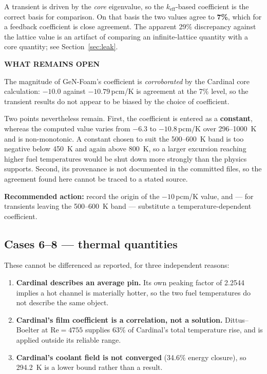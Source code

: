 \documentclass[11pt,a4paper]{article}
\newcommand{\keff}{\ensuremath{k_{\mathrm{eff}}}}
\newenvironment{callout}[2][warnbg]
 {\edef\calloutcolor{#1}\def\callouttitle{#2}%
  \begin{lrbox}{\calloutbox}%
  \begin{minipage}{\dimexpr\textwidth-2\fboxsep\relax}%
  \vspace{1mm}\par\textbf{\footnotesize\MakeUppercase{\callouttitle}}\par\vspace{1mm}\small}
 {\vspace{1mm}\end{minipage}\end{lrbox}%
  \par\vspace{2mm}\noindent\colorbox{\calloutcolor}{\usebox{\calloutbox}}\par\vspace{2mm}}
\begin{document}
A transient is driven by the \emph{core} eigenvalue, so the $\keff$-based coefficient is the
correct basis for comparison. On that basis the two values agree to \textbf{7\%}, which for a
feedback coefficient is close agreement. The apparent 29\% discrepancy against the
lattice value is an artifact of comparing an infinite-lattice quantity with a core quantity;
see Section~\ref{sec:leak}.

\begin{callout}{What remains open}
The magnitude of GeN-Foam's coefficient is \emph{corroborated} by the Cardinal core
calculation: $-10.0$ against $-10.79$\,pcm/K is agreement at the 7\% level, so the transient
results do not appear to be biased by the choice of coefficient.

Two points nevertheless remain. First, the coefficient is entered as a \textbf{constant},
whereas the computed value varies from $-6.3$ to $-10.8$\,pcm/K over 296--\SI{1000}{\kelvin}
and is non-monotonic. A constant chosen to suit the 500--\SI{600}{\kelvin} band is too
negative below \SI{450}{\kelvin} and again above \SI{800}{\kelvin}, so a larger excursion
reaching higher fuel temperatures would be shut down more strongly than the physics supports.
Second, its provenance is not documented in the committed files, so the agreement found here
cannot be traced to a stated source.

\textbf{Recommended action:} record the origin of the $-10$\,pcm/K value, and --- for
transients leaving the 500--\SI{600}{\kelvin} band --- substitute a temperature-dependent
coefficient.
\end{callout}

\subsection{Cases 6--8 --- thermal quantities}
These cannot be differenced as reported, for three independent reasons:
\begin{enumerate}\itemsep2pt
\item \textbf{Cardinal describes an average pin.} Its own peaking factor of 2.2544 implies a hot
channel is materially hotter, so the two fuel temperatures do not describe the same object.
\item \textbf{Cardinal's film coefficient is a correlation, not a solution.} Dittus--Boelter at
$\mathrm{Re}=4755$ supplies 63\% of Cardinal's total temperature rise, and is applied outside its
reliable range.
\item \textbf{Cardinal's coolant field is not converged} (34.6\% energy closure), so
\SI{294.2}{\kelvin} is a lower bound rather than a result.
\end{enumerate}
\end{document}

